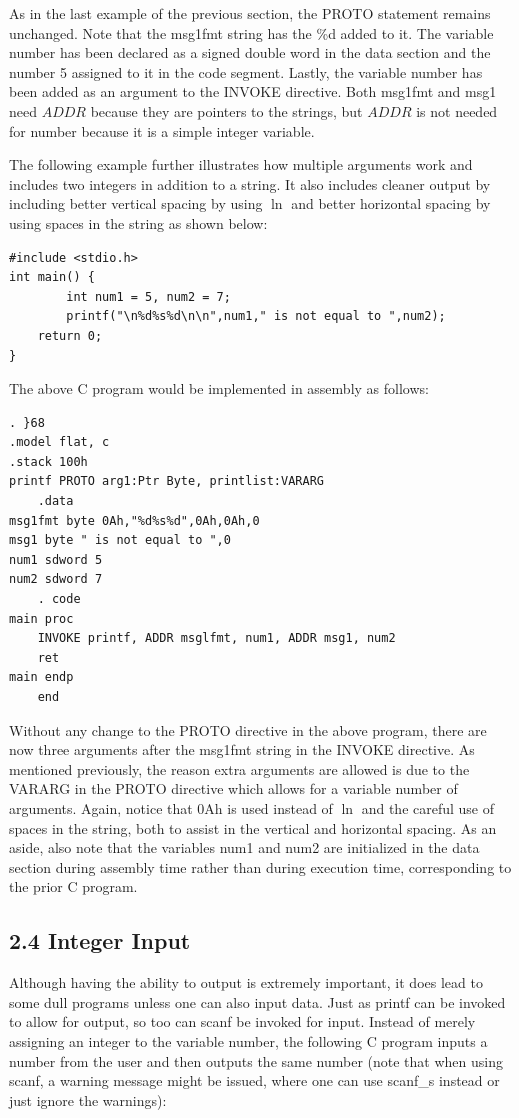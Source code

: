 \documentclass[10pt]{book}
\begin{document}
As in the last example of the previous section, the PROTO statement remains unchanged. Note that the msg1fmt string has the \%d added to it. The variable number has been declared as a signed double word in the data section and the number 5 assigned to it in the code segment. Lastly, the variable number has been added as an argument to the INVOKE directive. Both msg1fmt and msg1 need $A D D R$ because they are pointers to the strings, but $A D D R$ is not needed for number because it is a simple integer variable.

The following example further illustrates how multiple arguments work and includes two integers in addition to a string. It also includes cleaner output by including better vertical spacing by using $\ln$ and better horizontal spacing by using spaces in the string as shown below:

\begin{verbatim}
#include <stdio.h>
int main() {
        int num1 = 5, num2 = 7;
        printf("\n%d%s%d\n\n",num1," is not equal to ",num2);
    return 0;
}
\end{verbatim}

The above C program would be implemented in assembly as follows:


\begin{verbatim}
. }68
.model flat, c
.stack 100h
printf PROTO arg1:Ptr Byte, printlist:VARARG
    .data
msg1fmt byte 0Ah,"%d%s%d",0Ah,0Ah,0
msg1 byte " is not equal to ",0
num1 sdword 5
num2 sdword 7
    . code
main proc
    INVOKE printf, ADDR msglfmt, num1, ADDR msg1, num2
    ret
main endp
    end
\end{verbatim}

Without any change to the PROTO directive in the above program, there are now three arguments after the msg1fmt string in the INVOKE directive. As mentioned previously, the reason extra arguments are allowed is due to the VARARG in the PROTO directive which allows for a variable number of arguments. Again, notice that 0Ah is used instead of $\ln$ and the careful use of spaces in the string, both to assist in the vertical and horizontal spacing. As an aside, also note that the variables num1 and num2 are initialized in the data section during assembly time rather than during execution time, corresponding to the prior C program.

\subsection*{2.4 Integer Input}
Although having the ability to output is extremely important, it does lead to some dull programs unless one can also input data. Just as printf can be invoked to allow for output, so too can scanf be invoked for input. Instead of merely assigning an integer to the variable number, the following C program inputs a\\
number from the user and then outputs the same number (note that when using scanf, a warning message might be issued, where one can use scanf\_s instead or just ignore the warnings):
\end{document}
